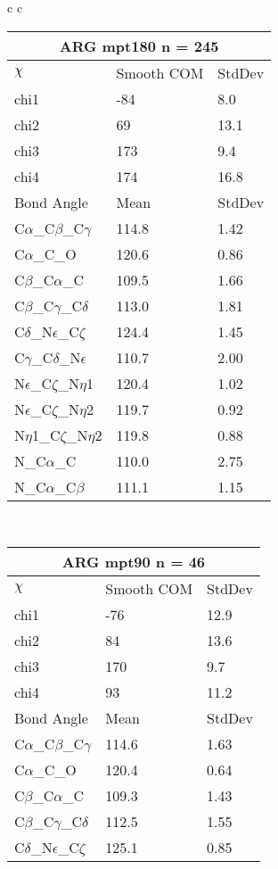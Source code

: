 \begin{longtable}{ c c }
\begin{tabular}{ l l l }
  \toprule
  \multicolumn{3}{c}{ARG \textbf{mpt180} n = 245} \\ \toprule
  $\chi$       & Smooth COM & StdDev \\ \midrule
  chi1 & -84 & 8.0 \\ 
  chi2 & 69 & 13.1 \\ 
  chi3 & 173 & 9.4 \\ 
  chi4 & 174 & 16.8 \\ \midrule
  Bond Angle   & Mean     & StdDev \\ \midrule
  C$\alpha$\_C$\beta$\_C$\gamma$ & 114.8 & 1.42\\
  C$\alpha$\_C\_O & 120.6 & 0.86\\
  C$\beta$\_C$\alpha$\_C & 109.5 & 1.66\\
  C$\beta$\_C$\gamma$\_C$\delta$ & 113.0 & 1.81\\
  C$\delta$\_N$\epsilon$\_C$\zeta$ & 124.4 & 1.45\\
  C$\gamma$\_C$\delta$\_N$\epsilon$ & 110.7 & 2.00\\
  N$\epsilon$\_C$\zeta$\_N$\eta$1 & 120.4 & 1.02\\
  N$\epsilon$\_C$\zeta$\_N$\eta$2 & 119.7 & 0.92\\
  N$\eta$1\_C$\zeta$\_N$\eta$2 & 119.8 & 0.88\\
  N\_C$\alpha$\_C & 110.0 & 2.75\\
  N\_C$\alpha$\_C$\beta$ & 111.1 & 1.15\\
  \bottomrule
  \end{tabular}
  \\
  \begin{tabular}{ l l l }
  \toprule
  \multicolumn{3}{c}{ARG \textbf{mpt90} n = 46} \\ \toprule
  $\chi$       & Smooth COM & StdDev \\ \midrule
  chi1 & -76 & 12.9 \\ 
  chi2 & 84 & 13.6 \\ 
  chi3 & 170 & 9.7 \\ 
  chi4 & 93 & 11.2 \\ \midrule
  Bond Angle   & Mean     & StdDev \\ \midrule
  C$\alpha$\_C$\beta$\_C$\gamma$ & 114.6 & 1.63\\
  C$\alpha$\_C\_O & 120.4 & 0.64\\
  C$\beta$\_C$\alpha$\_C & 109.3 & 1.43\\
  C$\beta$\_C$\gamma$\_C$\delta$ & 112.5 & 1.55\\
  C$\delta$\_N$\epsilon$\_C$\zeta$ & 125.1 & 0.85\\

\end{tabular}
\end{longtable}
